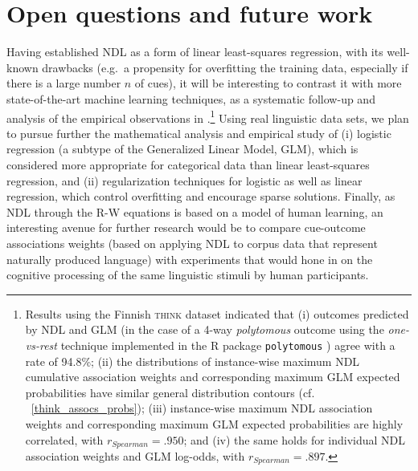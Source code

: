 \documentclass[conference]{IEEEtran}
\begin{document}
\section{Open questions and future work}
\label{sec:outlook}

Having established NDL as a form of linear least-squares regression, with its well-known drawbacks (e.g.\ a propensity for overfitting the training data, especially if there is a large number $n$ of cues), it will be interesting to contrast it with more state-of-the-art machine learning techniques, as a systematic follow-up and analysis of the empirical observations in \cite{arppebaayen2011}.\footnote{Results using the Finnish \textsc{think} dataset \cite{arppe2008, arppe2013} indicated that (i) outcomes predicted by NDL and GLM (in the case of a 4-way \emph{polytomous} outcome using the \emph{one-vs-rest} technique implemented in the R package \texttt{polytomous} \cite{arppe2013}) agree with a rate of 94.8\%; (ii) the distributions of instance-wise maximum NDL cumulative association weights and corresponding maximum GLM expected probabilities have similar general distribution contours (cf. \figurename ~\ref{think_assocs_probs}); (iii) instance-wise maximum NDL association weights and corresponding maximum GLM expected probabilities are highly correlated, with $r_{Spearman}=.950$; and (iv) the same holds for individual NDL association weights and GLM log-odds, with $r_{Spearman}=.897$.} Using real linguistic data sets, we plan to pursue further the mathematical analysis and empirical study of (i) logistic regression (a subtype of the Generalized Linear Model, GLM), which is considered more appropriate for categorical data than linear least-squares regression, and (ii) regularization techniques for logistic as well as linear regression, which control overfitting and encourage sparse solutions. Finally, as NDL through the R-W equations is based on a model of human learning, an interesting avenue for further research would be to compare cue-outcome associations weights (based on applying NDL to corpus data that represent naturally produced language) with experiments that would hone in on the cognitive processing of the same linguistic stimuli by human participants.


\end{document}
